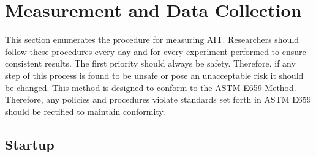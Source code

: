 \documentclass[letterpaper,11pt]{article}
\begin{document}
\newpage
\renewcommand{\baselinestretch}{.4}\normalsize
\tableofcontents    %
\renewcommand{\baselinestretch}{1.0}\normalsize

        

\newpage

\section{Measurement and Data Collection} \label{sec:experiments}
This section enumerates the procedure for measuring AIT. Researchers 
should follow these procedures every day and for every experiment performed to 
ensure consistent results. The first priority should always be safety. 
Therefore, if any step of this process is found to be unsafe or pose an 
unacceptable risk it should be changed. This method is designed to conform to
the ASTM E659 Method. Therefore, any policies and procedures violate standards
set forth in ASTM E659 should be rectified to maintain conformity.
    
    \subsection{Startup}
    
\end{document}

